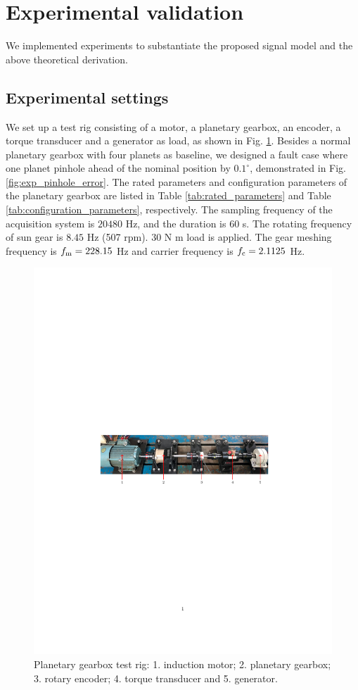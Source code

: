 \documentclass[a4paper,fleqn]{cas-sc}%
\begin{document}
\section{Experimental validation\label{sec:experimental_validation}}
We implemented experiments to substantiate the proposed signal model and the above theoretical derivation.
\subsection{Experimental settings}
\par We set up a test rig consisting of a motor, a planetary gearbox, an encoder,  a torque transducer and a generator as load, as shown in Fig. \ref{fig:test_rig}. Besides a normal planetary gearbox with four planets as baseline,  we designed a fault case where one planet pinhole ahead of the nominal position by $0.1^{\circ}$, demonstrated in Fig. \ref{fig:exp_pinhole_error}. The rated parameters and configuration parameters of the planetary gearbox are listed in Table \ref{tab:rated_parameters} and Table \ref{tab:configuration_parameters}, respectively. The sampling frequency of the acquisition system is $20480$ Hz, and the duration is $60$ s. The rotating frequency of sun gear is $8.45$ Hz (507 rpm). $30$ N m load is applied. The gear meshing frequency is $f_{\rm m}=228.15$ Hz and carrier frequency is $f_{\rm c}=2.1125$ Hz.
\begin{figure}[pos=htbp]
    \centering
    \includegraphics{test_rig_configuration.pdf}
    \caption{Planetary gearbox test rig: 1. induction motor; 2. planetary gearbox; 3. rotary encoder; 4. torque transducer and 5. generator.}
    \label{fig:test_rig}
\end{figure} 
\end{document}
